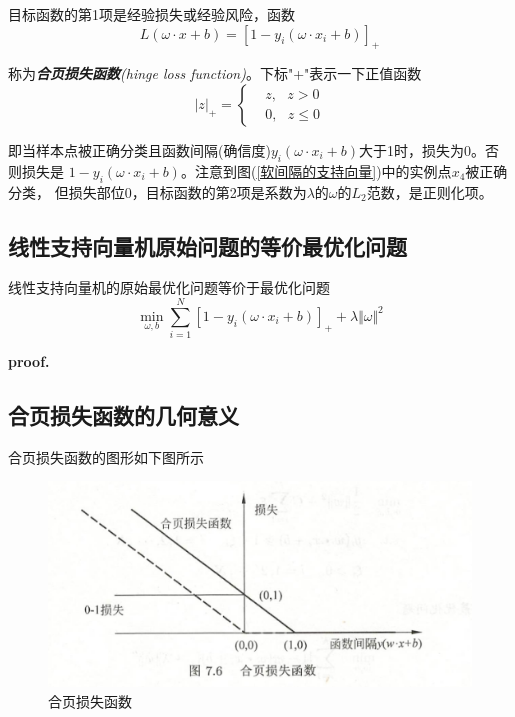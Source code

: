 目标函数的第1项是经验损失或经验风险，函数
\begin{equation}
    L(\omega\cdot x+b)=[1-y_i(\omega\cdot x_i+b)]_{+}
\end{equation}

称为\textsl{\textbf{合页损失函数}(hinge loss function)}。下标"+"表示一下正值函数
\begin{equation}
    |z|_+=\begin{cases}
        & z, \ \ \ z>0\\
        & 0, \ \ \ z\leqslant 0 
    \end{cases}
\end{equation}

即当样本点被正确分类且函数间隔(确信度)$y_i(\omega\cdot x_i+b)$大于1时，损失为0。否则损失是
$1-y_i(\omega\cdot x_i+b)$。注意到图(\ref{软间隔的支持向量})中的实例点$x_4$被正确分类，
但损失部位0，目标函数的第2项是系数为$\lambda$的$\omega$的$L_2$范数，是正则化项。

\subsection*{线性支持向量机原始问题的等价最优化问题 }
\begin{theorem}
    线性支持向量机的原始最优化问题等价于最优化问题
    \begin{equation}
        \min\limits_{\omega,b}\sum\limits_{i=1}^{N}[1-y_i(\omega\cdot x_i+b)]_{+}+\lambda\Vert\omega\Vert^2
    \end{equation}
\end{theorem}
\textbf{proof. }

\subsection*{合页损失函数的几何意义}
合页损失函数的图形如下图所示
\begin{figure}[H]
    \centering
    \includegraphics[scale=0.45]{figures/合页损失函数.png}
    \caption{合页损失函数}
    \label{合页损失函数}
\end{figure}

